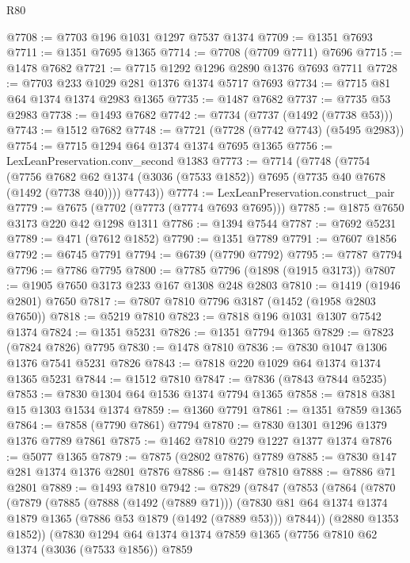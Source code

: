 \begin{lexlean}{R80}
\begin{coremodule}
@7708 := @7703 @196 @1031 @1297 @7537 @1374
@7709 := @1351 @7693
@7711 := @1351 @7695 @1365
@7714 := @7708 (@7709 @7711) @7696
@7715 := @1478 @7682
@7721 := @7715 @1292 @1296 @2890 @1376 @7693 @7711
@7728 := @7703 @233 @1029 @281 @1376 @1374 @5717 @7693
@7734 := @7715 @81 @64 @1374 @1374 @2983 @1365
@7735 := @1487 @7682
@7737 := @7735 @53 @2983
@7738 := @1493 @7682
@7742 := @7734 (@7737 (@1492 (@7738 @53)))
@7743 := @1512 @7682
@7748 := @7721 (@7728 (@7742 @7743) (@5495 @2983))
@7754 := @7715 @1294 @64 @1374 @1374 @7695 @1365
@7756 := LexLeanPreservation.conv_second @1383
@7773 := @7714
    (@7748
      (@7754
        (@7756 @7682 @62 @1374 (@3036 (@7533 @1852)) @7695 (@7735 @40 @7678 (@1492 (@7738 @40))))
        @7743))
@7774 := LexLeanPreservation.construct_pair
@7779 := @7675 (@7702 (@7773 (@7774 @7693 @7695)))
@7785 := @1875 @7650 @3173 @220 @42 @1298 @1311
@7786 := @1394 @7544
@7787 := @7692 @5231
@7789 := @471 (@7612 @1852)
@7790 := @1351 @7789
@7791 := @7607 @1856
@7792 := @6745 @7791
@7794 := @6739 (@7790 @7792)
@7795 := @7787 @7794
@7796 := @7786 @7795
@7800 := @7785 @7796 (@1898 (@1915 @3173))
@7807 := @1905 @7650 @3173 @233 @167 @1308 @248 @2803
@7810 := @1419 (@1946 @2801) @7650
@7817 := @7807 @7810 @7796 @3187 (@1452 (@1958 @2803 @7650))
@7818 := @5219 @7810
@7823 := @7818 @196 @1031 @1307 @7542 @1374
@7824 := @1351 @5231
@7826 := @1351 @7794 @1365
@7829 := @7823 (@7824 @7826) @7795
@7830 := @1478 @7810
@7836 := @7830 @1047 @1306 @1376 @7541 @5231 @7826
@7843 := @7818 @220 @1029 @64 @1374 @1374 @1365 @5231
@7844 := @1512 @7810
@7847 := @7836 (@7843 @7844 @5235)
@7853 := @7830 @1304 @64 @1536 @1374 @7794 @1365
@7858 := @7818 @381 @15 @1303 @1534 @1374
@7859 := @1360 @7791
@7861 := @1351 @7859 @1365
@7864 := @7858 (@7790 @7861) @7794
@7870 := @7830 @1301 @1296 @1379 @1376 @7789 @7861
@7875 := @1462 @7810 @279 @1227 @1377 @1374
@7876 := @5077 @1365
@7879 := @7875 (@2802 @7876) @7789
@7885 := @7830 @147 @281 @1374 @1376 @2801 @7876
@7886 := @1487 @7810
@7888 := @7886 @71 @2801
@7889 := @1493 @7810
@7942 := @7829
    (@7847
      (@7853
        (@7864
          (@7870
            (@7879
              (@7885
                (@7888 (@1492 (@7889 @71)))
                (@7830 @81 @64 @1374 @1374 @1879 @1365 (@7886 @53 @1879 (@1492 (@7889 @53))) @7844))
              (@2880 @1353 @1852))
            (@7830
              @1294
              @64
              @1374
              @1374
              @7859
              @1365
              (@7756
                @7810
                @62
                @1374
                (@3036 (@7533 @1856))
                @7859

\end{coremodule}
\end{lexlean}
